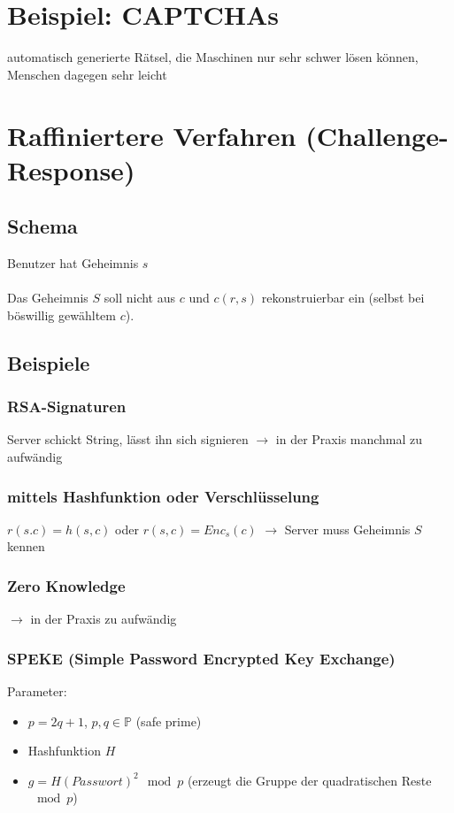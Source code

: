 \documentclass[a4paper,twoside,DIV15,BCOR12mm]{scrbook}
\begin{document}
\section{Beispiel: CAPTCHAs}

automatisch generierte Rätsel, die Maschinen nur sehr schwer lösen können, Menschen dagegen sehr leicht

\section{Raffiniertere Verfahren (Challenge-Response)}

\subsection{Schema} Benutzer hat Geheimnis $s$\\

\\

Das Geheimnis $S$ soll nicht aus $c$ und $c(r,s)$ rekonstruierbar ein (selbst bei böswillig gewähltem $c$).

\subsection{Beispiele}

\subsubsection{RSA-Signaturen} Server schickt String, lässt ihn sich signieren $\rightarrow$ in der Praxis manchmal zu aufwändig
\subsubsection{mittels Hashfunktion oder Verschlüsselung} $r(s.c) = h(s,c)$ oder $r(s,c) = Enc_s(c)$ $\rightarrow$ Server muss Geheimnis $S$ kennen
\subsubsection{Zero Knowledge} $\rightarrow$ in der Praxis zu aufwändig
\subsubsection{SPEKE (Simple Password Encrypted Key Exchange)}

Parameter:

	\begin{itemize}	
		\item $p = 2q + 1$, $p,q \in \mathbb{P}$ (\glqq safe prime\grqq)
		\item Hashfunktion $H$
		\item $g = H(Passwort)^2 \mod{p}$ (erzeugt die Gruppe der quadratischen Reste $\mod{p}$)
	\end{itemize}
	
\end{document}
